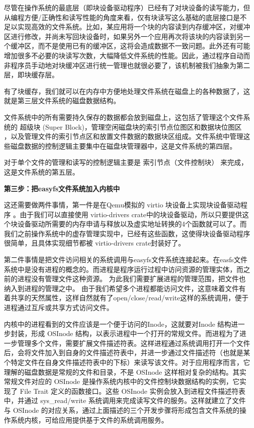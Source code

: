 尽管在操作系统的最底层（即块设备驱动程序）已经有了对块设备的读写能力，但从编程方便/正确性和读写性能的角度来看，仅有块读写这么基础的底层接口是不足以实现高效的文件系统。比如，某应用将一个块的内容读到内存缓冲区，对缓冲区进行修改，并尚未写回块设备时，如果另外一个应用再次将该块的内容读到另一个缓冲区，而不是使用已有的缓冲区，这将会造成数据不一致问题。此外还有可能增加很多不必要的块读写次数，大幅降低文件系统的性能。因此，通过程序自动而非程序员手动地对块缓冲区进行统一管理也就很必要了，该机制被我们抽象为第二层，即块缓存层。

有了块缓存，我们就可以在内存中方便地处理文件系统在磁盘上的各种数据了，这就是第三层文件系统的磁盘数据结构。

文件系统中的所有需要持久保存的数据都会放到磁盘上，这包括了管理这个文件系统的 超级块 (Super Block)，管理空闲磁盘块的索引节点位图区和数据块位图区 ，以及管理文件的索引节点区和放置文件数据的数据块区组成。文件系统中管理这些磁盘数据的控制逻辑主要集中在磁盘块管理器中，这是文件系统的第四层。

对于单个文件的管理和读写的控制逻辑主要是 索引节点（文件控制块） 来完成，这是文件系统的第五层。

\textbf{第三步：把easyfs文件系统加入内核中}

这还需要做两件事情，第一件是在Qemu模拟的 virtio 块设备上实现块设备驱动程序 。由于我们可以直接使用 virtio-drivers crate中的块设备驱动，所以只要提供这个块设备驱动所需要的内存申请与释放以及虚实地址转换的4个函数就可以了。而我们之前操作系统中的虚存管理实现中，已经有这些函数，这使得块设备驱动程序很简单，且具体实现细节都被 virtio-drivers crate封装好了。

第二件事情是把文件访问相关的系统调用与easyfs文件系统连接起来。在easfs文件系统中是没有进程的概念的。而进程是程序运行过程中访问资源的管理实体，而之前的进程没有管理文件这种资源。 为此我们需要扩展进程的管理范围，把文件也纳入到进程的管理之中。 由于我们希望多个进程都能访问文件，这意味着文件有着共享的天然属性，这样自然就有了open/close/read/write这样的系统调用，便于进程通过互斥或共享方式访问文件。

内核中的进程看到的文件应该是一个便于访问的Inode，这就要对Inode 结构进一步封装，形成 OSInode 结构，以表示进程中一个打开的常规文件。而进程为了进一步管理多个文件，需要扩展文件描述符表。这样进程通过系统调用打开一个文件后，会将文件加入到自身的文件描述符表中，并进一步通过文件描述符（也就是某个特定文件在自身文件描述符表中的下标）来读写该文件。对于应用程序而言，它理解的磁盘数据是常规的文件和目录，不是 OSInode 这样相对复杂的结构。其实常规文件对应的 OSInode 是操作系统内核中的文件控制块数据结构的实例，它实现了 File Trait 定义的函数接口。这些 OSInode 实例会放入到进程文件描述符表中，并通过 sys\_read/write 系统调用来完成读写文件的服务。这样就建立了文件与 OSInode 的对应关系，通过上面描述的三个开发步骤将形成包含文件系统的操作系统内核，可给应用提供基于文件的系统调用服务。
